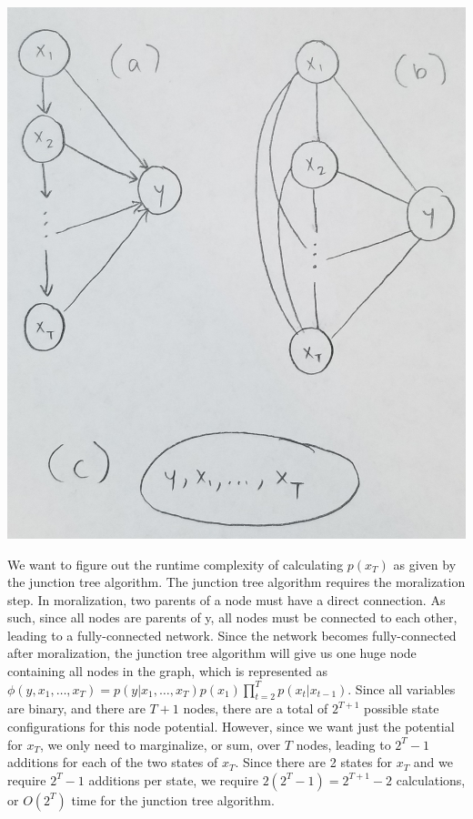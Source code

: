 \documentclass[12pt]{article}
\begin{document}
\includegraphics[scale=0.1]{q7-trees}

We want to figure out the runtime complexity of calculating $p(x_T)$ as given by the junction tree algorithm. The junction tree algorithm requires the moralization step. In moralization, two parents of a node must have a direct connection. As such, since all nodes are parents of y, all nodes must be connected to each other, leading to a fully-connected network. Since the network becomes fully-connected after moralization, the junction tree algorithm will give us one huge node containing all nodes in the graph, which is represented as $\phi(y, x_1, \dots, x_T) = p(y \vert x_1, \dots, x_T)p(x_1)\prod_{t = 2}^{T} p(x_t \vert x_{t-1})$. Since all variables are binary, and there are $T+1$ nodes, there are a total of $2^{T+1}$ possible state configurations for this node potential. However, since we want just the potential for $x_T$, we only need to marginalize, or sum, over $T$ nodes, leading to $2^T-1$ additions for each of the two states of $x_T$. Since there are 2 states for $x_T$ and we require $2^T - 1$ additions per state, we require $2(2^T - 1) = 2^{T+1} - 2$ calculations, or $O(2^T)$ time for the junction tree algorithm.
\end{document}
